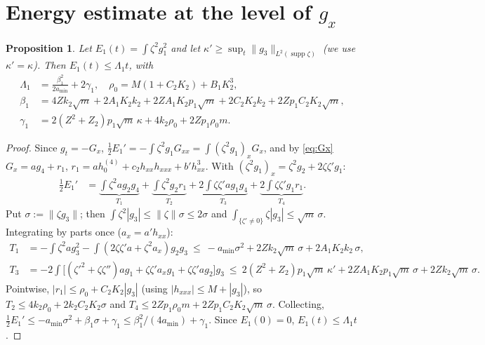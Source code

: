 \documentclass[11pt]{article}
\newtheorem{proposition}[theorem]{Proposition}
\theoremstyle{remark}\newtheorem{remark}[theorem]{Remark}
\newcommand{\nrm}[1]{\lVert #1\rVert}
\begin{document}
\section{Energy estimate at the level of $g_x$}
\begin{proposition}\label{prop:E1}
Let $E_1(t)=\int\zeta^2g_1^2$ and let $\kappa'\ge\sup_t\nrm{g_3}_{L^2(\operatorname{supp}\zeta)}$ (we use $\kappa'=\kappa$). Then $E_1(t)\le\Lambda_1t$, with
\begin{align*}
\Lambda_1&=\frac{\beta_1^2}{2a_{\min}}+2\gamma_1,\quad \rho_0=M(1+C_2K_2)+B_1K_2^3,\\
\beta_1&=4Zk_2\sqrt m+2A_1K_2k_2+2ZA_1K_2p_1\sqrt m+2C_2K_2k_2+2Zp_1C_2K_2\sqrt m,\\
\gamma_1&=2(Z^2+Z_2)p_1\sqrt m\,\kappa+4k_2\rho_0+2Zp_1\rho_0m .
\end{align*}
\end{proposition}
\begin{proof}
Since $g_t=-G_x$, $\tfrac12E_1'=-\int\zeta^2g_1G_{xx}=\int(\zeta^2g_1)_xG_x$, and by \eqref{eq:Gx} $G_x=ag_4+r_1$, $r_1=ah_0^{(4)}+c_2h_{xx}h_{xxx}+b'h_{xx}^3$. With $(\zeta^2g_1)_x=\zeta^2g_2+2\zeta\zeta'g_1$:
\begin{align*}
\tfrac12E_1'&=\underbrace{\int\zeta^2ag_2g_4}_{T_1}+\underbrace{\int\zeta^2g_2r_1}_{T_2}+\underbrace{2\int\zeta\zeta'ag_1g_4}_{T_3}+\underbrace{2\int\zeta\zeta'g_1r_1}_{T_4}.
\end{align*}
Put $\sigma:=\nrm{\zeta g_3}$; then $\int\zeta^2|g_3|\le\nrm\zeta\sigma\le2\sigma$ and $\int_{\{\zeta'\ne0\}}\zeta|g_3|\le\sqrt m\,\sigma$. Integrating by parts once ($a_x=a'h_{xx}$):
\begin{align*}
T_1&=-\int\zeta^2ag_3^2-\int(2\zeta\zeta'a+\zeta^2a_x)g_2g_3\ \le\ -a_{\min}\sigma^2+2Zk_2\sqrt m\,\sigma+2A_1K_2k_2\,\sigma,\\
T_3&=-2\int\big[(\zeta'^2+\zeta\zeta'')ag_1+\zeta\zeta'a_xg_1+\zeta\zeta'ag_2\big]g_3\ \le\ 2(Z^2+Z_2)p_1\sqrt m\,\kappa'+2ZA_1K_2p_1\sqrt m\,\sigma+2Zk_2\sqrt m\,\sigma .
\end{align*}
Pointwise, $|r_1|\le\rho_0+C_2K_2|g_3|$ (using $|h_{xxx}|\le M+|g_3|$), so
$T_2\le4k_2\rho_0+2k_2C_2K_2\sigma$ and $T_4\le2Zp_1\rho_0m+2Zp_1C_2K_2\sqrt m\,\sigma$. Collecting, $\frac12E_1'\le-a_{\min}\sigma^2+\beta_1\sigma+\gamma_1\le\beta_1^2/(4a_{\min})+\gamma_1$. Since $E_1(0)=0$, $E_1(t)\le\Lambda_1t$.
\end{proof}
\end{document}

